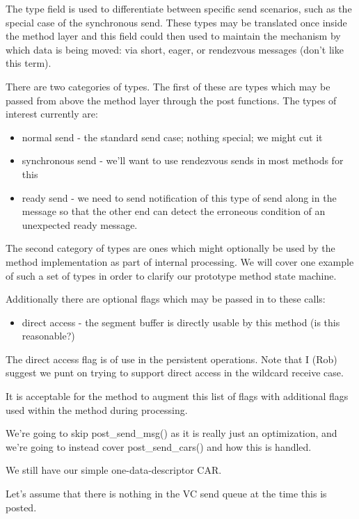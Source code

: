 \documentclass[11pt,letterpaper]{article}
\begin{document}
The type field is used to differentiate between specific send scenarios, such
as the special case of the synchronous send.  These types may be translated
once inside the method layer and this field could then used to maintain the
mechanism by which data is being moved: via short, eager, or rendezvous
messages (don't like this term).

There are two categories of types.  The first of these are types which may be
passed from above the method layer through the post functions.  The types of
interest currently are:
\begin{itemize}
\item normal send - the standard send case; nothing special; we might cut it
\item synchronous send - we'll want to use rendezvous sends in most methods for
  this
\item ready send - we need to send notification of this type of send along in
  the message so that the other end can detect the erroneous condition of an
  unexpected ready message.
\end{itemize}

The second category of types are ones which might optionally be used by the
method implementation as part of internal processing.  We will cover one
example of such a set of types in order to clarify our prototype method state
machine.

Additionally there are optional flags which may be passed in to these calls:
\begin{itemize}
\item direct access - the segment buffer is directly usable by this method (is
  this reasonable?)
\end{itemize}

The direct access flag is of use in the persistent operations.  Note that I
(Rob) suggest we punt on trying to support direct access in the wildcard
receive case.

It is acceptable for the method to augment this list of flags with additional
flags used within the method during processing.

We're going to skip post\_send\_msg() as it is really just an optimization, and
we're going to instead cover post\_send\_cars() and how this is handled.

We still have our simple one-data-descriptor CAR.

Let's assume that there is nothing in the VC send queue at the time this is
posted.
\end{document}
